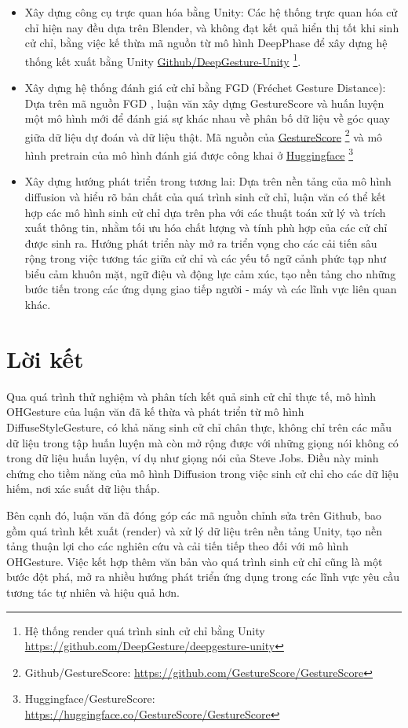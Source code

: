 \begin{itemize}
	\item Xây dựng công cụ trực quan hóa bằng Unity: Các hệ thống trực quan hóa cử chỉ hiện nay đều dựa trên Blender, và không đạt kết quả hiển thị tốt khi sinh cử chỉ, bằng việc kế thừa mã nguồn từ mô hình DeepPhase \cite{starke2022deepphase} để xây dựng hệ thống kết xuất bằng Unity \hyperlink{https://github.com/DeepGesture/deepgesture-unity}{Github/DeepGesture-Unity}
	\footnote{Hệ thống render quá trình sinh cử chỉ bằng Unity \url{https://github.com/DeepGesture/deepgesture-unity}}.
	
	\item Xây dựng hệ thống đánh giá cử chỉ bằng FGD (Fréchet Gesture Distance): Dựa trên mã nguồn FGD \cite{yoon2020speech}, luận văn xây dựng GestureScore và huấn luyện một mô hình mới để đánh giá sự khác nhau về phân bố dữ liệu về góc quay giữa dữ liệu dự đoán và dữ liệu thật. Mã nguồn của  \hyperlink{https://github.com/GestureScore/GestureScore}{GestureScore} \footnote{Github/GestureScore: \url{https://github.com/GestureScore/GestureScore}} và mô hình pretrain của mô hình đánh giá được công khai ở  \hyperlink{https://huggingface.co/GestureScore}{Huggingface} \footnote{Huggingface/GestureScore: \url{https://huggingface.co/GestureScore/GestureScore}}
	\item Xây dựng hướng phát triển trong tương lai: Dựa trên nền tảng của mô hình diffusion và hiểu rõ bản chất của quá trình sinh cử chỉ, luận văn có thể kết hợp các mô hình sinh cử chỉ dựa trên pha với các thuật toán xử lý và trích xuất thông tin, nhằm tối ưu hóa chất lượng và tính phù hợp của các cử chỉ được sinh ra. Hướng phát triển này mở ra triển vọng cho các cải tiến sâu rộng trong việc tương tác giữa cử chỉ và các yếu tố ngữ cảnh phức tạp như biểu cảm khuôn mặt, ngữ điệu và động lực cảm xúc, tạo nền tảng cho những bước tiến trong các ứng dụng giao tiếp người - máy và các lĩnh vực liên quan khác.
\end{itemize}



\newpage

\section{Lời kết}

Qua quá trình thử nghiệm và phân tích kết quả sinh cử chỉ thực tế, mô hình OHGesture của luận văn đã kế thừa và phát triển từ mô hình DiffuseStyleGesture, có khả năng sinh cử chỉ chân thực, không chỉ trên các mẫu dữ liệu trong tập huấn luyện mà còn mở rộng được với những giọng nói không có trong dữ liệu huấn luyện, ví dụ như giọng nói của Steve Jobs. Điều này minh chứng cho tiềm năng của mô hình Diffusion trong việc sinh cử chỉ cho các dữ liệu hiếm, nơi xác suất dữ liệu thấp.

Bên cạnh đó, luận văn đã đóng góp các mã nguồn chỉnh sửa trên Github, bao gồm quá trình kết xuất (render) và xử lý dữ liệu trên nền tảng Unity, tạo nền tảng thuận lợi cho các nghiên cứu và cải tiến tiếp theo đối với mô hình OHGesture. Việc kết hợp thêm văn bản vào quá trình sinh cử chỉ cũng là một bước đột phá, mở ra nhiều hướng phát triển ứng dụng trong các lĩnh vực yêu cầu tương tác tự nhiên và hiệu quả hơn.
